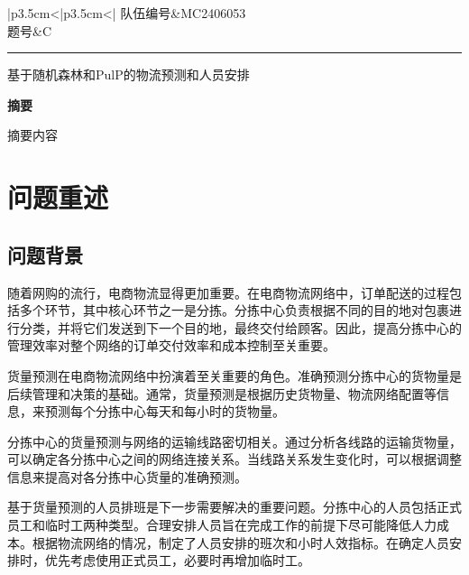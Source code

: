 \documentclass[UTF8]{article}%
\begin{document}
	\setlength{\lineskip}{8pt}
	\setlength{\lineskiplimit}{8pt}
    
\begin{table}[!ht]
    \renewcommand\arraystretch{1.5}
    \centering  
    \begin{tabular}{|p{3.5cm}<{\centering}|p{3.5cm}<{\centering}|}
        \hline
        {队伍编号}&MC2406053\\
        \hline
        题号&C\\
        \hline        
    \end{tabular}
\end{table}

\setcounter{page}{1}

\noindent\rule{\linewidth}{1pt}
\begin{center}
    \Large 基于随机森林和PulP的物流预测和人员安排
\end{center}
\begin{center}
    \large\bf 摘要
\end{center}

摘要内容



\newpage

\tableofcontents


\newpage
\setcounter{page}{1}


\section{问题重述}
\subsection{问题背景}
随着网购的流行，电商物流显得更加重要。在电商物流网络中，订单配送的过程包括多个环节，其中核心环节之一是分拣。分拣中心负责根据不同的目的地对包裹进行分类，并将它们发送到下一个目的地，最终交付给顾客。因此，提高分拣中心的管理效率对整个网络的订单交付效率和成本控制至关重要。

货量预测在电商物流网络中扮演着至关重要的角色。准确预测分拣中心的货物量是后续管理和决策的基础。通常，货量预测是根据历史货物量、物流网络配置等信息，来预测每个分拣中心每天和每小时的货物量。

分拣中心的货量预测与网络的运输线路密切相关。通过分析各线路的运输货物量，可以确定各分拣中心之间的网络连接关系。当线路关系发生变化时，可以根据调整信息来提高对各分拣中心货量的准确预测。

基于货量预测的人员排班是下一步需要解决的重要问题。分拣中心的人员包括正式员工和临时工两种类型。合理安排人员旨在完成工作的前提下尽可能降低人力成本。根据物流网络的情况，制定了人员安排的班次和小时人效指标。在确定人员安排时，优先考虑使用正式员工，必要时再增加临时工。
\end{document}

